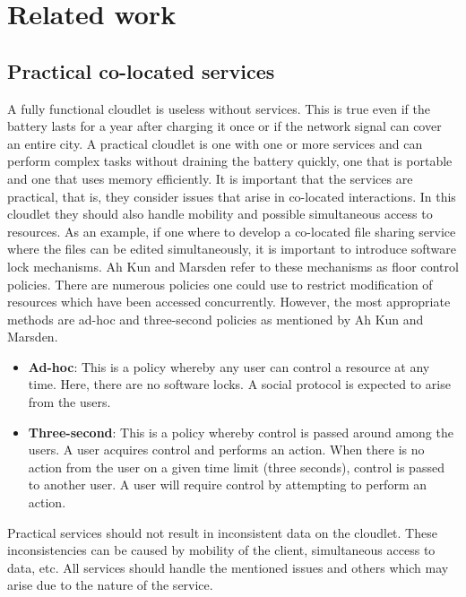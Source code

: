 \section{Related work}

\subsection{Practical co-located services}
A fully functional cloudlet is useless without services.
This is true even if the battery lasts for a year after
charging it once or if the network signal can cover an entire city.
A practical cloudlet is one with one or more services and can perform
complex tasks without draining the battery quickly, one that is portable
and one that uses memory efficiently. It is important that the services
are practical, that is, they consider issues that arise in co-located
interactions. In this cloudlet they should also handle mobility and possible
simultaneous access to resources. As an example, if one where to develop
a co-located file sharing service where the files can be edited simultaneously, it is
important to introduce software lock mechanisms. Ah Kun and Marsden\cite{ah2007co} refer
to these mechanisms as floor control policies. There are numerous policies one
could use to restrict modification of resources which have been accessed concurrently.
However, the most appropriate methods are ad-hoc and three-second policies as
mentioned by Ah Kun and Marsden\cite{ah2007co}.

\begin{itemize}

\item \textbf{Ad-hoc}: This is a policy whereby any user
can control a resource at any time. Here, there
are no software locks. A social protocol is
expected to arise from the users\cite[p. 282]{ah2007co}.

\item \textbf{Three-second}: This is a policy whereby
control is passed around among the users. A
user acquires control and performs an action.
When there is no action from the user on a given
time limit (three seconds), control is passed to
another user. A user will require control by
attempting to perform an action\cite[p. 282]{ah2007co}.
\end{itemize}

Practical services should not result in inconsistent data on the cloudlet.
These inconsistencies can be caused by mobility of the client, simultaneous access to data, etc. All services should handle the mentioned issues and others which may arise due to the nature of the service.


